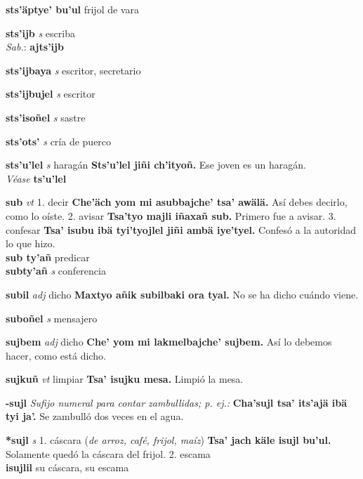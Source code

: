 \documentclass[10pt]{scrbook}
\newcommand{\entry}[1]{\textbf{#1}}
\newcommand{\onedefinition}[1]{#1.}
\newcommand{\nontranslationdef}[1]{\textit{#1}}
\newcommand{\partofspeech}[1]{\textit{#1}}
\newcommand{\spanishtranslation}[1]{#1}
\newcommand{\clarification}[1]{(\textit{#1})}
\newcommand{\cholexample}[1]{\textbf{#1}}
\newcommand{\exampletranslation}[1]{#1}
\newcommand{\dialectvariant}[1]{\\\textit{#1}:}
\newcommand{\dialectword}[1]{\textbf{#1}}
\newcommand{\alsosee}[1]{\\\textit{Véase} \textbf{#1}}
\newcommand{\secondaryentry}[1]{\\\textbf{#1}}
\newcommand{\secondpartofspeech}[1]{\textit{#1}}
\newcommand{\secondtranslation}[1]{#1}
\begin{document}
\begin{multicols}{2}
\entry{sts'äptye' bu'ul}
\spanishtranslation{frijol de vara}

\entry{sts'ijb}
\partofspeech{s}
\spanishtranslation{escriba}
\dialectvariant{Sab.}
\dialectword{ajts'ijb}

\entry{sts'ijbaya}
\partofspeech{s}
\spanishtranslation{escritor, secretario}

\entry{sts'ijbujel}
\partofspeech{s}
\spanishtranslation{escritor}

\entry{sts'isoñel}
\partofspeech{s}
\spanishtranslation{sastre}

\entry{sts'ots'}
\partofspeech{s}
\spanishtranslation{cría de puerco}

\entry{sts'u'lel}
\partofspeech{s}
\spanishtranslation{haragán}
\cholexample{Sts'u'lel jiñi ch'ityoñ.}
\exampletranslation{Ese joven es un haragán.}
\alsosee{ts'u'lel}

\entry{sub}
\partofspeech{vt}
\onedefinition{1}
\spanishtranslation{decir}
\cholexample{Che'äch yom mi asubbajche' tsa' awälä.}
\exampletranslation{Así debes decirlo, como lo oíste.}
\onedefinition{2}
\spanishtranslation{avisar}
\cholexample{Tsa'tyo majli iñaxañ sub.}
\exampletranslation{Primero fue a avisar.}
\onedefinition{3}
\spanishtranslation{confesar}
\cholexample{Tsa' isubu ibä tyi'tyojlel jiñi ambä iye'tyel.}
\exampletranslation{Confesó a la autoridad lo que hizo.}
\secondaryentry{sub ty'añ}
\secondtranslation{predicar}
\secondaryentry{subty'añ}
\secondpartofspeech{s}
\secondtranslation{conferencia}

\entry{subil}
\partofspeech{adj}
\spanishtranslation{dicho}
\cholexample{Maxtyo añik subilbaki ora tyal.}
\exampletranslation{No se ha dicho cuándo viene.}

\entry{suboñel}
\partofspeech{s}
\spanishtranslation{mensajero}

\entry{sujbem}
\partofspeech{adj}
\spanishtranslation{dicho}
\cholexample{Che' yom mi lakmelbajche' sujbem.}
\exampletranslation{Así lo debemos hacer, como está dicho.}

\entry{sujkuñ}
\partofspeech{vt}
\spanishtranslation{limpiar}
\cholexample{Tsa' isujku mesa.}
\exampletranslation{Limpió la mesa.}

\entry{-sujl}
\nontranslationdef{Sufijo numeral para contar zambullidas; p. ej.:}
\cholexample{Cha'sujl tsa' its'ajä ibä tyi ja'.}
\exampletranslation{Se zambulló dos veces en el agua.}

\entry{*sujl}
\partofspeech{s}
\onedefinition{1}
\spanishtranslation{cáscara}
\clarification{de arroz, café, frijol, maíz}
\cholexample{Tsa' jach käle isujl bu'ul.}
\exampletranslation{Solamente quedó la cáscara del frijol.}
\onedefinition{2}
\spanishtranslation{escama}
\secondaryentry{isujlil}
\secondtranslation{su cáscara, su escama}


\end{multicols}
\end{document}

